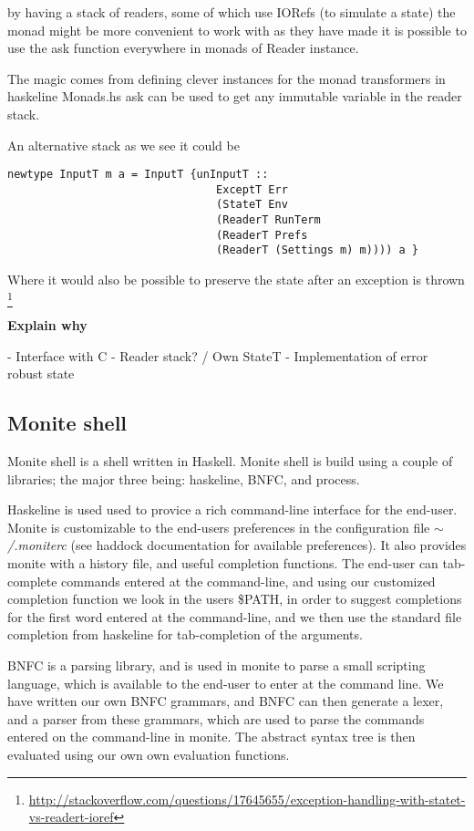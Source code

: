 \documentclass[11pt,a4paper]{article}
\begin{document}
by having a stack of readers, some of which use IORefs (to simulate a state) the
monad might be more convenient to work with as they have made it is possible to
use the ask function everywhere in monads of Reader instance.

The magic comes from defining clever instances for the monad transformers in
haskeline Monads.hs ask can be used to get any immutable variable in the reader
stack.

An alternative stack as we see it could be

\begin{verbatim}
newtype InputT m a = InputT {unInputT ::
                                ExceptT Err
                                (StateT Env
                                (ReaderT RunTerm
                                (ReaderT Prefs
                                (ReaderT (Settings m) m)))) a }
\end{verbatim}

Where it would also be possible to preserve the state after an exception is
thrown \footnote{\url{http://stackoverflow.com/questions/17645655/exception-handling-with-statet-vs-readert-ioref}}

\textbf{Explain why}

- Interface with C
- Reader stack? / Own StateT
- Implementation of error robust state


\subsection{Monite shell}
Monite shell is a shell written in Haskell. Monite shell is build using a couple
of libraries; the major three being: haskeline, BNFC, and process.

Haskeline is used used to provice a rich command-line interface for the
end-user. Monite is customizable to the end-users preferences in the
configuration file $\mathtt{\sim}$\textit{/.moniterc} (see haddock documentation
for available preferences). It also provides monite with a history file, and
useful completion functions. The end-user can tab-complete commands entered at
the command-line, and using our customized completion function we look in the
users \$PATH, in order to suggest completions for the first word entered at the
command-line, and we then use the standard file completion from haskeline for
tab-completion of the arguments.

BNFC is a parsing library, and is used in monite to parse a small scripting
language, which is available to the end-user to enter at the command line. We
have written our own BNFC grammars, and BNFC can then generate a lexer, and a
parser from these grammars, which are used to parse the commands entered on the
command-line in monite. The abstract syntax tree is then evaluated using our own
own evaluation functions.
\end{document}
